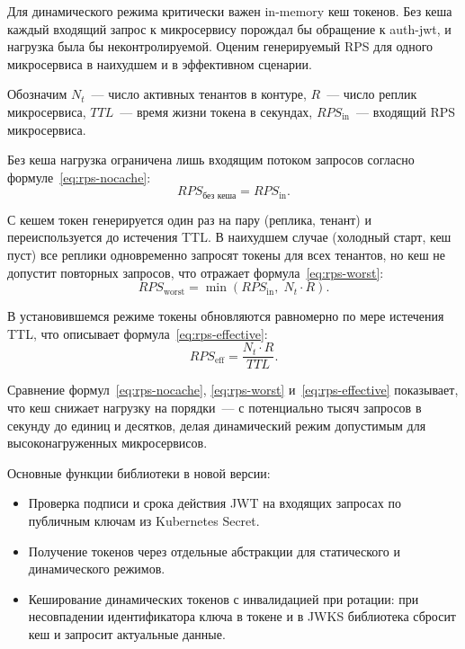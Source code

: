 Для динамического режима критически важен in-memory кеш токенов.
Без кеша каждый входящий запрос к микросервису
порождал бы обращение к auth-jwt, и нагрузка была бы неконтролируемой.
Оценим генерируемый RPS для одного микросервиса
в наихудшем и в эффективном сценарии.

Обозначим $N_t$~--- число активных тенантов в контуре,
$R$~--- число реплик микросервиса,
$TTL$~--- время жизни токена в секундах,
$RPS_{\text{in}}$~--- входящий RPS микросервиса.

Без кеша нагрузка ограничена лишь входящим потоком запросов
согласно формуле~\eqref{eq:rps-nocache}:
\begin{equation}\label{eq:rps-nocache}
  RPS_{\text{без кеша}} = RPS_{\text{in}}.
\end{equation}

С кешем токен генерируется один раз на пару (реплика, тенант)
и переиспользуется до истечения TTL.
В наихудшем случае (холодный старт, кеш пуст)
все реплики одновременно запросят токены для всех тенантов,
но кеш не допустит повторных запросов, что отражает
формула~\eqref{eq:rps-worst}:
\begin{equation}\label{eq:rps-worst}
  RPS_{\text{worst}} = \min\!\left(RPS_{\text{in}},\; N_t \cdot R\right).
\end{equation}

В установившемся режиме токены обновляются равномерно
по мере истечения TTL, что описывает формула~\eqref{eq:rps-effective}:
\begin{equation}\label{eq:rps-effective}
  RPS_{\text{eff}} = \frac{N_t \cdot R}{TTL}.
\end{equation}

Сравнение формул~\eqref{eq:rps-nocache}, \eqref{eq:rps-worst}
и~\eqref{eq:rps-effective} показывает, что кеш снижает нагрузку на порядки~---
с потенциально тысяч запросов в секунду до единиц и десятков,
делая динамический режим допустимым для высоконагруженных микросервисов.

Основные функции библиотеки в новой версии:
\begin{itemize}
  \item Проверка подписи и срока действия JWT на входящих запросах
    по публичным ключам из Kubernetes Secret.
  \item Получение токенов через отдельные абстракции
    для статического и динамического режимов.
  \item Кеширование динамических токенов с инвалидацией при ротации:
    при несовпадении идентификатора ключа в токене и в JWKS
    библиотека сбросит кеш и запросит актуальные данные.
\end{itemize}

